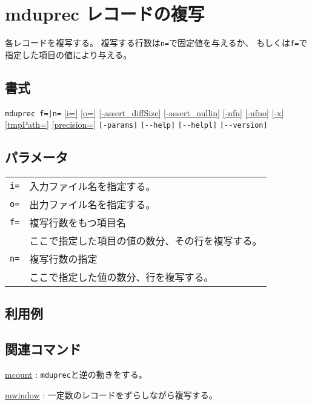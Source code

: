 
%

\section{mduprec レコードの複写\label{sect:mduprec}}
各レコードを複写する。
複写する行数は\verb|n=|で固定値を与えるか、
もしくは\verb|f=|で指定した項目の値により与える。

\subsection*{書式}
\verb/mduprec f=|n=/
\hyperref[sect:option_i]{[i=]}
\hyperref[sect:option_o]{[o=]}
\hyperref[sect:option_assert_diffSize]{[-assert\_diffSize]}
\hyperref[sect:option_assert_nullin]{[-assert\_nullin]}
\hyperref[sect:option_nfn]{[-nfn]} 
\hyperref[sect:option_nfno]{[-nfno]}  
\hyperref[sect:option_x]{[-x]}
\hyperref[sect:option_option_tmppath]{[tmpPath=]}
\hyperref[sect:option_precision]{[precision=]}
\verb|[-params]|
\verb|[--help]|
\verb|[--helpl]|
\verb|[--version]|\\

\subsection*{パラメータ}
\begin{table}[htbp]
{\small
\begin{tabular}{ll}
\verb|i=|    & 入力ファイル名を指定する。\\
\verb|o=|    & 出力ファイル名を指定する。\\
\verb|f=|    & 複写行数をもつ項目名\\
             & ここで指定した項目の値の数分、その行を複写する。\\
\verb|n=|    & 複写行数の指定\\
             & ここで指定した値の数分、行を複写する。\\
\end{tabular} 
}
\end{table} 
\subsection*{利用例}


\subsection*{関連コマンド}
\hyperref[sect:mcount]{mcount} : \verb|mduprec|と逆の動きをする。

\hyperref[sect:mwindow]{mwindow} : 一定数のレコードをずらしながら複写する。

%
